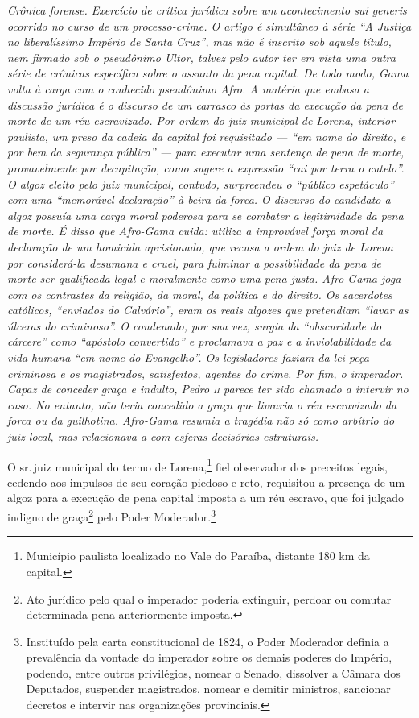 \begin{didascalia}\itshape
Crônica forense. Exercício de crítica jurídica sobre um
acontecimento \textnormal{sui generis} ocorrido no curso de um processo-crime.
O artigo é simultâneo à série ``A Justiça no liberalíssimo Império de
Santa Cruz'', mas não é inscrito sob aquele título, nem
firmado sob o pseudônimo Ultor, talvez pelo autor ter em vista
uma outra série de crônicas específica sobre o assunto da pena capital.
De todo modo, Gama volta à carga com o conhecido pseudônimo Afro.
A matéria que embasa a discussão jurídica é 
o discurso de um carrasco às portas da
execução da pena de morte de um réu escravizado. Por ordem do juiz
municipal de Lorena, interior paulista, um preso da cadeia da capital
foi requisitado --- ``em nome do direito, e por bem da segurança pública''
--- para executar uma sentença de pena de morte, provavelmente por
decapitação, como sugere a expressão ``cai por terra o cutelo''. O algoz
eleito pelo juiz municipal, contudo, surpreendeu o ``público espetáculo''
com uma ``memorável declaração'' à beira da forca.
O discurso do candidato a algoz
possuía uma carga moral poderosa para se combater a legitimidade da pena
de morte. É disso que Afro-Gama cuida: utiliza a improvável força
moral da declaração de um homicida aprisionado, que recusa a ordem do
juiz de Lorena por considerá-la desumana e cruel, para fulminar a
possibilidade da pena de morte ser qualificada legal e moralmente como
uma pena justa. Afro-Gama joga com os contrastes da religião, da
moral, da política e do direito. Os sacerdotes católicos, ``enviados do
Calvário'', eram os reais algozes que pretendiam ``lavar as úlceras do
criminoso''. O condenado, por sua vez, surgia da ``obscuridade do cárcere''
como ``apóstolo convertido'' e proclamava a paz e a inviolabilidade da
vida humana ``em nome do Evangelho''. Os legisladores faziam da lei peça
criminosa e os magistrados, satisfeitos, agentes do crime. Por fim, o
imperador. Capaz de conceder graça e indulto, Pedro \textsc{ii} parece ter sido
chamado a intervir no caso. No entanto, não teria concedido a graça que
livraria o réu escravizado da forca ou da guilhotina. Afro-Gama
resumia a tragédia não só como arbítrio do juiz local, mas relacionava-a
com esferas decisórias estruturais.
\end{didascalia}



O sr.\,juiz municipal do termo de Lorena,\footnote{Município paulista
  localizado no Vale do Paraíba, distante 180 km da capital.} fiel
observador dos preceitos legais, cedendo aos impulsos de seu coração
piedoso e reto, requisitou a presença de um algoz para a execução de
pena capital imposta a um réu escravo, que foi julgado indigno de
graça\footnote{Ato jurídico pelo qual o imperador poderia extinguir,
  perdoar ou comutar determinada pena anteriormente imposta.} pelo Poder
Moderador.\footnote{Instituído pela carta constitucional de 1824, o
  Poder Moderador definia a prevalência da vontade do imperador sobre os
  demais poderes do Império, podendo, entre outros privilégios, nomear o
  Senado, dissolver a Câmara dos Deputados, suspender magistrados,
  nomear e demitir ministros, sancionar decretos e intervir nas
  organizações provinciais.\label{moderador}}

